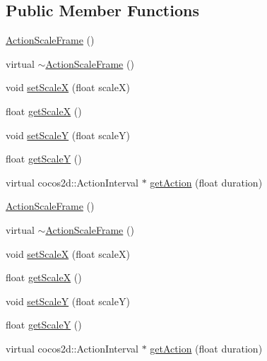 \subsection*{Public Member Functions}
\begin{DoxyCompactItemize}
\item 
\hyperlink{classcocostudio_1_1ActionScaleFrame_a2d0f8b6985992bf72dc44d8f4c7cd806}{Action\+Scale\+Frame} ()
\item 
virtual \hyperlink{classcocostudio_1_1ActionScaleFrame_a9b289f37e9cd2f76e15ef80628596430}{$\sim$\+Action\+Scale\+Frame} ()
\item 
void \hyperlink{classcocostudio_1_1ActionScaleFrame_ad3d2121b08ecfeaf332d97d5493a4502}{set\+ScaleX} (float scaleX)
\item 
float \hyperlink{classcocostudio_1_1ActionScaleFrame_ae6864bcaa0365fbf7ebdb215fc348b50}{get\+ScaleX} ()
\item 
void \hyperlink{classcocostudio_1_1ActionScaleFrame_a987134a143fa3e7119faac0fc8e31935}{set\+ScaleY} (float scaleY)
\item 
float \hyperlink{classcocostudio_1_1ActionScaleFrame_a792904e90d31dce42e7e70c553f9173c}{get\+ScaleY} ()
\item 
virtual cocos2d\+::\+Action\+Interval $\ast$ \hyperlink{classcocostudio_1_1ActionScaleFrame_a7835af6973dddcd7714efd7c45c9bc80}{get\+Action} (float duration)
\item 
\hyperlink{classcocostudio_1_1ActionScaleFrame_a2d0f8b6985992bf72dc44d8f4c7cd806}{Action\+Scale\+Frame} ()
\item 
virtual \hyperlink{classcocostudio_1_1ActionScaleFrame_a0e32dbc979d21e9f306723103f4eaecd}{$\sim$\+Action\+Scale\+Frame} ()
\item 
void \hyperlink{classcocostudio_1_1ActionScaleFrame_ad3d2121b08ecfeaf332d97d5493a4502}{set\+ScaleX} (float scaleX)
\item 
float \hyperlink{classcocostudio_1_1ActionScaleFrame_ae6864bcaa0365fbf7ebdb215fc348b50}{get\+ScaleX} ()
\item 
void \hyperlink{classcocostudio_1_1ActionScaleFrame_a987134a143fa3e7119faac0fc8e31935}{set\+ScaleY} (float scaleY)
\item 
float \hyperlink{classcocostudio_1_1ActionScaleFrame_a792904e90d31dce42e7e70c553f9173c}{get\+ScaleY} ()
\item 
virtual cocos2d\+::\+Action\+Interval $\ast$ \hyperlink{classcocostudio_1_1ActionScaleFrame_a7952170933c3dde44525f8917d2e661a}{get\+Action} (float duration)
\end{DoxyCompactItemize}

